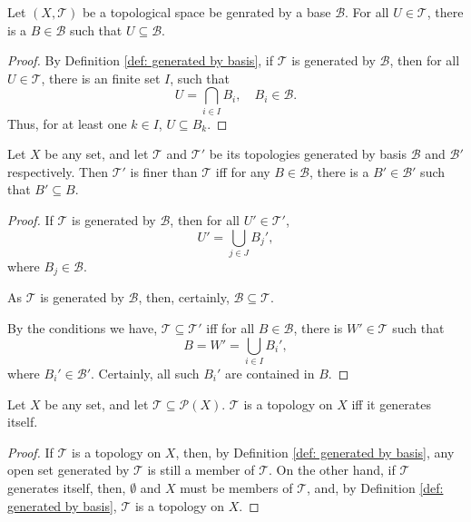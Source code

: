 \begin{proposition}
	Let $(X, \mathcal T)$ be a topological space be genrated by a base $\mathcal B$. For all $U \in \mathcal T$, there is a $B \in \mathcal B$ such that $U \subseteq \mathcal B$.
	
	\begin{proof}
		By Definition \ref{def: generated by basis}, if $\mathcal T$ is generated by $\mathcal B$, then for all $U \in \mathcal T$, there is an finite set $I$, such that
		$$
		U = \bigcap_{i \in I} B_i, \quad B_i \in \mathcal B.
		$$
		Thus, for at least one $k \in I$, $U \subseteq B_k$.
	\end{proof}
\end{proposition}


\begin{proposition}
	Let $X$ be any set, and let $\mathcal T$ and $\mathcal T'$ be its topologies generated by basis $\mathcal B$ and $\mathcal B'$ respectively. Then $\mathcal T'$ is finer than $\mathcal T$ iff for any $B \in \mathcal B$, there is a $B' \in \mathcal B'$ such that $B' \subseteq B$.
	
	\begin{proof}
		If $\mathcal T$ is generated by $\mathcal B$, then for all $U' \in \mathcal T'$,
		$$
		U' = \bigcup_{j \in J} B_j',
		$$
		where $B_j \in \mathcal B$.
		
		As $\mathcal T$ is generated by $\mathcal B$, then, certainly, $\mathcal B \subseteq \mathcal T$.

		By the conditions we have, $\mathcal T \subseteq \mathcal T'$ iff for all $B \in \mathcal B$, there is $W' \in \mathcal T$ such that
		$$
		B = W' = \bigcup_{i \in I} B_i',
		$$
		where $B_i' \in \mathcal B'$. Certainly, all such $B_i'$ are contained in $B$.
	\end{proof}
\end{proposition}


\begin{proposition}
	Let $X$ be any set, and let $\mathcal T \subseteq \mathcal P(X)$. $\mathcal T$ is a topology on $X$ iff it generates itself.
	
	\begin{proof}
		If $\mathcal T$ is a topology on $X$, then, by Definition \ref{def: generated by basis}, any open set generated by $\mathcal T$ is still a member of $\mathcal T$. On the other hand, if $\mathcal T$ generates itself, then, $\emptyset$ and $X$ must be members of $\mathcal T$, and, by Definition \ref{def: generated by basis}, $\mathcal T$ is a topology on $X$.
	\end{proof}
\end{proposition}


